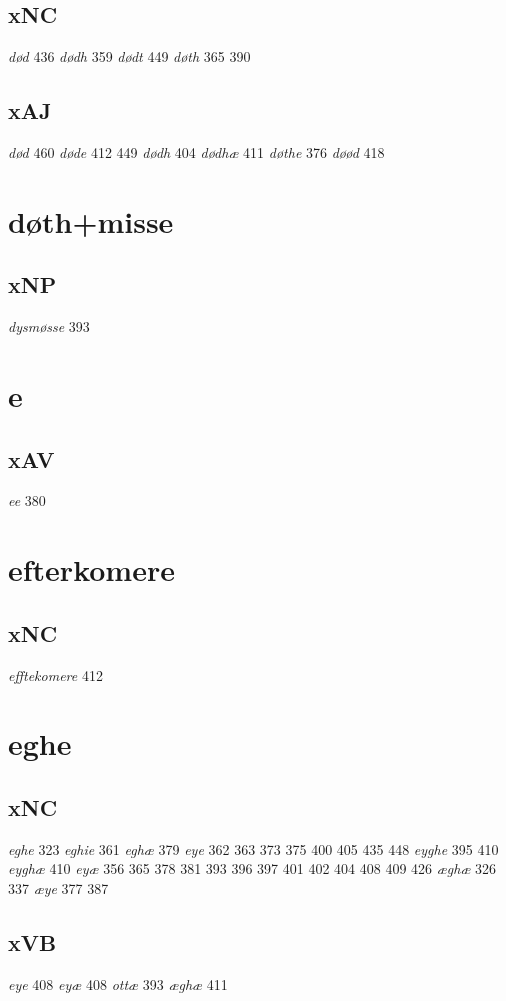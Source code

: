 \documentclass[a4paper,twocolumn]{article}
\begin{document}
\subsection{xNC}
\label{sec:org3ea2f3e}
\emph{død} 436 \emph{dødh} 359 \emph{dødt} 449 \emph{døth} 365 390 
\subsection{xAJ}
\label{sec:org6165393}
\emph{død} 460 \emph{døde} 412 449 \emph{dødh} 404 \emph{dødhæ} 411 \emph{døthe} 376 \emph{døød} 418 
\section{døth+misse}
\label{sec:org0c8816b}
\subsection{xNP}
\label{sec:orgd9f60ff}
\emph{dysmøsse} 393 
\section{e}
\label{sec:org1be1af7}
\subsection{xAV}
\label{sec:orgf42f9b5}
\emph{ee} 380 
\section{efterkomere}
\label{sec:orgde23e23}
\subsection{xNC}
\label{sec:org406d3d6}
\emph{efftekomere} 412 
\section{eghe}
\label{sec:org39b65c6}
\subsection{xNC}
\label{sec:orgc4481b7}
\emph{eghe} 323 \emph{eghie} 361 \emph{eghæ} 379 \emph{eye} 362 363 373 375 400 405 435 448 \emph{eyghe} 395 410 \emph{eyghæ} 410 \emph{eyæ} 356 365 378 381 393 396 397 401 402 404 408 409 426 \emph{æghæ} 326 337 \emph{æye} 377 387 
\subsection{xVB}
\label{sec:org7e8b116}
\emph{eye} 408 \emph{eyæ} 408 \emph{ottæ} 393 \emph{æghæ} 411 
\end{document}
